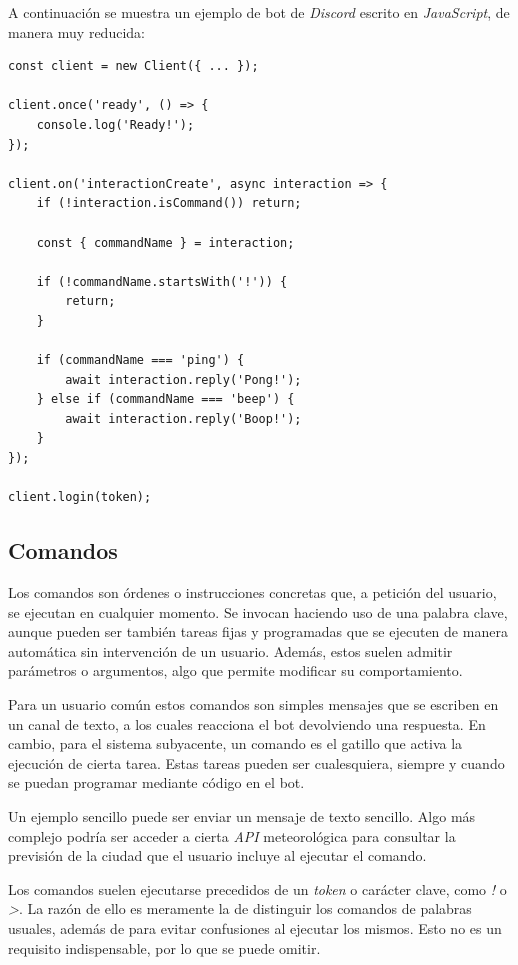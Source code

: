 A continuación se muestra un ejemplo de bot de \textit{Discord} escrito en \textit{JavaScript}, de manera muy reducida:

\begin{lstlisting}
const client = new Client({ ... });

client.once('ready', () => {
    console.log('Ready!');
});

client.on('interactionCreate', async interaction => {
    if (!interaction.isCommand()) return;

    const { commandName } = interaction;
    
    if (!commandName.startsWith('!')) {
    	return;
    }

    if (commandName === 'ping') {
        await interaction.reply('Pong!');
    } else if (commandName === 'beep') {
        await interaction.reply('Boop!');
    }
});

client.login(token);
\end{lstlisting}


\subsection{Comandos}

Los comandos son órdenes o instrucciones concretas que, a petición del usuario, se ejecutan en cualquier momento. Se invocan haciendo uso de una palabra clave, aunque pueden ser también tareas fijas y programadas que se ejecuten de manera automática sin intervención de un usuario. Además, estos suelen admitir parámetros o argumentos, algo que permite modificar su comportamiento.

Para un usuario común estos comandos son simples mensajes que se escriben en un canal de texto, a los cuales reacciona el bot devolviendo una respuesta. En cambio, para el sistema subyacente, un comando es el gatillo que activa la ejecución de cierta tarea. Estas tareas pueden ser cualesquiera, siempre y cuando se puedan programar mediante código en el bot.

Un ejemplo sencillo puede ser enviar un mensaje de texto sencillo. Algo más complejo podría ser acceder a cierta \textit{API} meteorológica para consultar la previsión de la ciudad que el usuario incluye al ejecutar el comando.

Los comandos suelen ejecutarse precedidos de un \textit{token} o carácter clave, como \textit{!} o \textit{>}. La razón de ello es meramente la de distinguir los comandos de palabras usuales, además de para evitar confusiones al ejecutar los mismos. Esto no es un requisito indispensable, por lo que se puede omitir.

